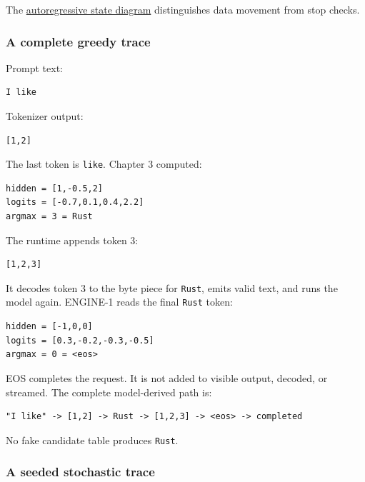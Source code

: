 \documentclass[
  10pt,
]{article}
\begin{document}
The
\href{https://github.com/hermonai/inside-the-llm-engine/blob/astra-visual-rewrite/diagrams/sampling/autoregressive-state.txt}{autoregressive
state diagram} distinguishes data movement from stop checks.

\subsubsection{A complete greedy trace}\label{a-complete-greedy-trace}

Prompt text:

\begin{verbatim}
I like
\end{verbatim}

Tokenizer output:

\begin{verbatim}
[1,2]
\end{verbatim}

The last token is \texttt{like}. Chapter 3 computed:

\begin{verbatim}
hidden = [1,-0.5,2]
logits = [-0.7,0.1,0.4,2.2]
argmax = 3 = Rust
\end{verbatim}

The runtime appends token 3:

\begin{verbatim}
[1,2,3]
\end{verbatim}

It decodes token 3 to the byte piece for \texttt{Rust}, emits valid
text, and runs the model again. ENGINE-1 reads the final \texttt{Rust}
token:

\begin{verbatim}
hidden = [-1,0,0]
logits = [0.3,-0.2,-0.3,-0.5]
argmax = 0 = <eos>
\end{verbatim}

EOS completes the request. It is not added to visible output, decoded,
or streamed. The complete model-derived path is:

\begin{verbatim}
"I like" -> [1,2] -> Rust -> [1,2,3] -> <eos> -> completed
\end{verbatim}

No fake candidate table produces \texttt{Rust}.

\subsubsection{A seeded stochastic
trace}\label{a-seeded-stochastic-trace}
\end{document}
